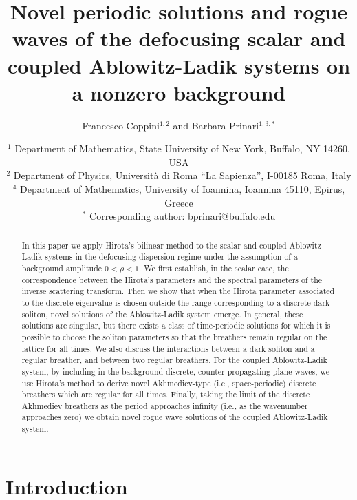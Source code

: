 \documentclass{article}
\title{Novel periodic solutions and rogue waves of the defocusing scalar and coupled Ablowitz-Ladik systems on a nonzero background}
\author{Francesco Coppini$^{1,2}$\; and Barbara Prinari$^{1,3,*}$}
\date{
    \small{$^{1}$ Department of Mathematics, State University of New York, Buffalo, NY 14260, USA\\
    $^2$ {Department of Physics, Università di Roma ``La Sapienza'', I-00185 Roma, Italy} \\
    $^4$ Department of Mathematics, University of Ioannina, Ioannina 45110, Epirus, Greece}\\
    $^*$ {Corresponding author: bprinari@buffalo.edu}
}
\begin{document}
\maketitle

\begin{abstract}
In this paper we apply Hirota’s bilinear method to the scalar and coupled Ablowitz-Ladik systems in the defocusing dispersion regime under the assumption of a background amplitude $0<\rho<1$. 
We first establish, in the scalar case, the correspondence between the Hirota's parameters and the spectral parameters of the inverse scattering transform. Then we show that when the Hirota parameter associated to the discrete eigenvalue is chosen outside the range corresponding to a discrete dark soliton, novel solutions of the Ablowitz-Ladik system emerge. In general, these solutions are singular, but there exists a class of time-periodic solutions for which it is possible to choose the soliton parameters so that the breathers remain regular on the lattice for all times. We also discuss the interactions between a dark soliton and a regular breather, and between two regular breathers. For the coupled Ablowitz-Ladik system, by including in the background discrete, counter-propagating plane waves, we use Hirota's method to derive novel Akhmediev-type (i.e., space-periodic) discrete breathers which are regular for all times. Finally, taking the limit of the discrete Akhmediev breathers as the period approaches infinity (i.e., as the wavenumber approaches zero) we obtain novel rogue wave solutions of the coupled Ablowitz-Ladik system.

\end{abstract}

\section{Introduction}
\end{document}
